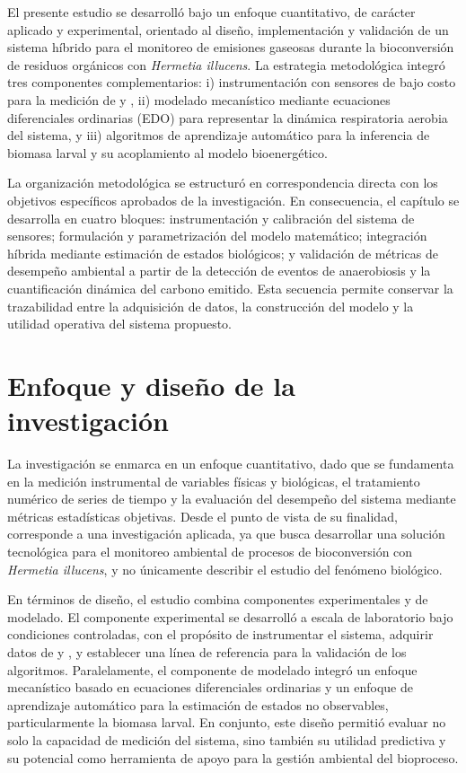 
El presente estudio se desarrolló bajo un enfoque cuantitativo, de carácter aplicado y experimental, orientado al diseño, implementación y validación de un sistema híbrido para el monitoreo de emisiones gaseosas durante la bioconversión de residuos orgánicos con \textit{Hermetia illucens}. La estrategia metodológica integró tres componentes complementarios: i) instrumentación con sensores de bajo costo para la medición de  y , ii) modelado mecanístico mediante ecuaciones diferenciales ordinarias (EDO) para representar la dinámica respiratoria aerobia del sistema, y iii) algoritmos de aprendizaje automático para la inferencia de biomasa larval y su acoplamiento al modelo bioenergético.

La organización metodológica se estructuró en correspondencia directa con los objetivos específicos aprobados de la investigación. En consecuencia, el capítulo se desarrolla en cuatro bloques: instrumentación y calibración del sistema de sensores; formulación y parametrización del modelo matemático; integración híbrida mediante estimación de estados biológicos; y validación de métricas de desempeño ambiental a partir de la detección de eventos de anaerobiosis y la cuantificación dinámica del carbono emitido. Esta secuencia permite conservar la trazabilidad entre la adquisición de datos, la construcción del modelo y la utilidad operativa del sistema propuesto.

\section{Enfoque y diseño de la investigación}

La investigación se enmarca en un enfoque cuantitativo, dado que se fundamenta en la medición instrumental de variables físicas y biológicas, el tratamiento numérico de series de tiempo y la evaluación del desempeño del sistema mediante métricas estadísticas objetivas. Desde el punto de vista de su finalidad, corresponde a una investigación aplicada, ya que busca desarrollar una solución tecnológica para el monitoreo ambiental de procesos de bioconversión con \textit{Hermetia illucens}, y no únicamente describir el estudio del fenómeno biológico.

En términos de diseño, el estudio combina componentes experimentales y de modelado. El componente experimental se desarrolló a escala de laboratorio bajo condiciones controladas, con el propósito de instrumentar el sistema, adquirir datos de  y , y establecer una línea de referencia para la validación de los algoritmos. Paralelamente, el componente de modelado integró un enfoque mecanístico basado en ecuaciones diferenciales ordinarias y un enfoque de aprendizaje automático para la estimación de estados no observables, particularmente la biomasa larval. En conjunto, este diseño permitió evaluar no solo la capacidad de medición del sistema, sino también su utilidad predictiva y su potencial como herramienta de apoyo para la gestión ambiental del bioproceso.

